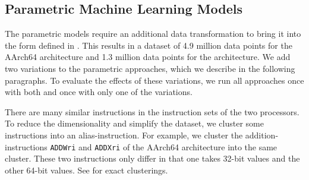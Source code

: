\subsection{Parametric Machine Learning Models}
\label{sec:eval:parametric}
The parametric models require an additional data transformation to bring it into the form defined in .
This results in a dataset of 4.9 million data points for the AArch64 architecture and 1.3 million data points for the \aurora{} architecture.
We add two variations to the parametric approaches, which we describe in the following paragraphs.
To evaluate the effects of these variations, we run all approaches once with both and once with only one of the variations.

There are many similar instructions in the instruction sets of the two processors.
To reduce the dimensionality and simplify the dataset, we cluster some instructions into an alias-instruction.
For example, we cluster the addition-instructions \lstinline|ADDWri| and \lstinline|ADDXri| of the AArch64 architecture into the same cluster.
These two instructions only differ in that one takes 32-bit values and the other 64-bit values.
See  for exact clusterings.

